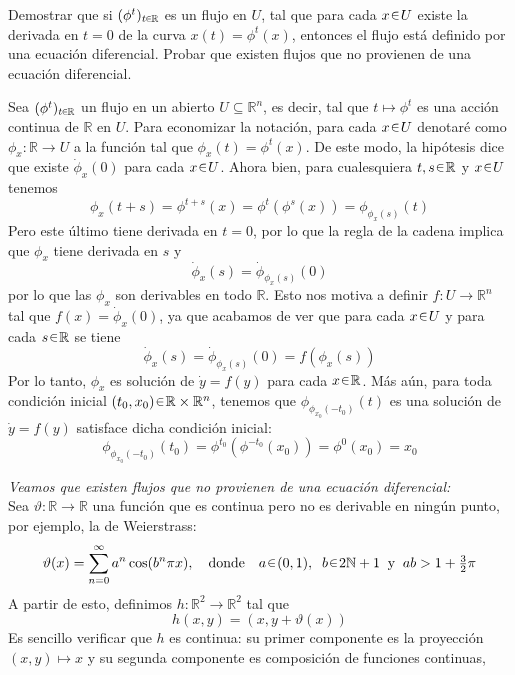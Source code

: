 \begin{ejer}
Demostrar que si $(\phi^t)_{t \en \mathbb{R}}$ es un flujo en $U$, tal que para cada 
$x \en U$ existe la derivada en $t = 0$ de la curva $x(t) = \phi^t(x)$, entonces el flujo
está definido por una ecuación diferencial. Probar que existen flujos que 
no provienen de una ecuación diferencial.
\end{ejer}
\begin{sol}
Sea $(\phi^t)_{t \en \mathbb{R}}$ un flujo en un abierto $U \subseteq \mathbb{R}^n$, es decir, tal que $t \mapsto \phi^t$ es una acción continua de $\mathbb{R}$ en $U$. Para economizar la notación, para cada $x \en U$ denotaré como $\phi_x \colon \mathbb{R} \to U$ a la función tal que $\phi_x(t) = \phi^t(x)$. De este modo, la hipótesis dice que existe $\dot\phi_{x}(0)$ para cada $x \en U$. Ahora bien, para cualesquiera $t,s \en \mathbb{R}$ y $x \en U$ tenemos 
\[
\phi_x(t+s) = \phi^{t+s}(x)= \phi^t(\phi^s(x))= \phi_{\phi_x(s)}(t)
\]
Pero este último tiene derivada en $t=0$, por lo que la regla de la cadena implica que $\phi_x$ tiene derivada en $s$ y
\[
\dot\phi_x(s) = \dot\phi_{\phi_x(s)}(0)
\]
por lo que las $\phi_x$ son derivables en todo $\mathbb{R}$. Esto nos motiva a definir $f \colon U \to \mathbb{R}^n$ tal que $f(x) = \dot\phi_x(0)$, ya que acabamos de ver que para cada $x \en U$ y para cada $s \en \mathbb{R}$ se tiene
\[
\dot{\phi}_x(s) = \dot\phi_{\phi_x(s)}(0) = f(\phi_x(s))
\]
Por lo tanto, $\phi_x$ es solución de $\dot{y} = f(y)$ para cada $x \en \mathbb{R}$. Más aún, para toda condición inicial $(t_0,x_0) \en \mathbb{R} \times \mathbb{R}^n$, tenemos que $\phi_{\phi_{x_0}(-t_0)}(t)$ es una solución de $\dot{y} = f(y)$ satisface dicha condición inicial:
\[
\phi_{\phi_{x_0}(-t_0)}(t_0) = \phi^{t_0}(\phi^{-t_0}(x_0)) = \phi^0(x_0) = x_0
\]
\par\vspace{1em}
\emph{Veamos que existen flujos que no provienen de una ecuación diferencial:}\\
Sea $\vartheta \colon \mathbb{R} \to \mathbb{R}$ una función que es continua pero no es derivable en ningún punto, por ejemplo, la de Weierstrass:
\[
\vartheta(x) = \sum^\infty_{n=0} a^n \cos(b^n\pi x),
\quad\text{donde}\quad
a \en (0,1),\;\; b\en 2\mathbb{N}+1 \;\;\text{y}\;\; ab > 1 + \tfrac{3}{2}\pi
\]
A partir de esto, definimos $h \colon \mathbb{R}^2 \to \mathbb{R}^2$ tal que 
\[
h(x,y) = (x, y + \vartheta(x))
\]
Es sencillo verificar que $h$ es continua: su primer componente es la proyección $(x,y) \mapsto x$ y su segunda componente es composición de funciones continuas,

\end{sol}
